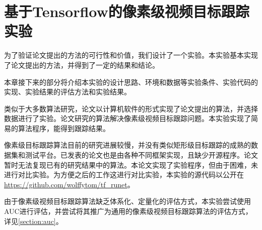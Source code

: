 
\chapter{基于Tensorflow的像素级视频目标跟踪实验} \label{section:experiment}
为了验证论文提出的方法的可行性和价值，我们设计了一个实验。本实验基本实现了论文提出的方法，并得到了一定的结果和结论。
\par
本章接下来的部分将介绍本实验的设计思路、环境和数据等实验条件、实验代码的实现、实验结果的评估方法和实验结果。
\par
类似于大多数算法研究，论文以计算机软件的形式实现了论文提出的算法，并选择数据进行了实验。论文研究的算法解决像素级视频目标跟踪问题。本实验实现了简易的算法程序，能得到跟踪结果。
\par
像素级目标跟踪算法目前的研究进展较慢，并没有类似矩形级目标跟踪的成熟的数据集和测试平台。已发表的论文也是由各种不同框架实现，且缺少开源程序。论文暂时无法复现已有的研究结果中的算法。本论文实现了实验程序，但由于困难，未进行对比实验。为方便之后的工作这进行对比实验，本实验的源代码以公开在\url{https://github.com/wolffytom/tf_runet}。
\par
由于像素级视频目标跟踪算法缺乏体系化、定量化的评估方式，本实验尝试使用AUC进行评估，并尝试将其推广为通用的像素级视频目标跟踪算法的评估方式，详见\ref{section:auc}。

